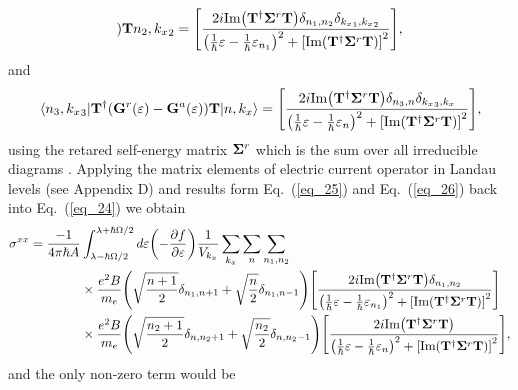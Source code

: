 \begin{widetext}
\begin{equation}
{  )\vb{T}}
  {n_2,{k_x}_2} =
  \qty[
  \frac{2i \text{Im}\qty(\vb{T}^{\dagger} \vb{\Sigma}^r \vb{T})
  \delta_{n_1,n_2}\delta_{{k_x}_1,{k_x}_2}}
  {
  \qty(
  \frac{1}{\hbar}\varepsilon -
  \frac{1}{\hbar}\varepsilon_{n_1}
  )^2
  + \qty[\text{Im}\qty(\vb{T}^{\dagger} \vb{\Sigma}^r \vb{T})]^2
  }],
\end{equation}
and
\begin{equation} \label{eq_26}
  \mel{{n_3,{k_x}_3}}{
  \vb{T}^{\dagger}
  \qty(
  \vb{G}^{r} (\varepsilon) - \vb{G}^{a} (\varepsilon)
  )\vb{T}}
  {n,{k_x}} =
  \qty[
  \frac{2i \text{Im}\qty(\vb{T}^{\dagger} \vb{\Sigma}^r \vb{T})
  \delta_{n_3,n}\delta_{{k_x}_3,{k_x}}}
  {
  \qty(
  \frac{1}{\hbar}\varepsilon -
  \frac{1}{\hbar}\varepsilon_{n}
  )^2
  + \qty[\text{Im}\qty(\vb{T}^{\dagger} \vb{\Sigma}^r \vb{T})]^2
  }],
\end{equation}
using the retared self-energy matrix $\vb{\Sigma}^r$ which is the sum over all irreducible diagrams \cite{wackerl20,wackerlthesis20}. Applying the matrix elements of electric current operator in Landau levels (see Appendix D) and
results form Eq.~(\ref{eq_25}) and Eq.~(\ref{eq_26}) back into Eq.~(\ref{eq_24}) we obtain
\begin{equation} \label{eq_27}
  \begin{aligned}
    {\sigma}^{xx}  =
    \frac{-1}{4\pi\hbar A} &
    \int_{\lambda-\hbar\Omega/2}^{\lambda+ \hbar\Omega/2} d\varepsilon
    \qty(
    -\frac{\partial f}{\partial \varepsilon})
    \frac{1}{V_{k_x}} \sum_{k_x} \sum_{n}
    \sum_{n_1,n_2}
    \\
    & \times
    \frac{e^2B}{{m_e}}
    \qty(\sqrt{\frac{n+1}{2}} \delta_{n_1,n+1} + \sqrt{\frac{n}{2}}
    \delta_{n_1,n-1})
    \qty[
    \frac{2i \text{Im}\qty(\vb{T}^{\dagger} \vb{\Sigma}^r \vb{T})
    \delta_{n_1,n_2}}
    {
    \qty(
    \frac{1}{\hbar}\varepsilon -
    \frac{1}{\hbar}\varepsilon_{n_1}
    )^2
    + \qty[\text{Im}\qty(\vb{T}^{\dagger} \vb{\Sigma}^r \vb{T})]^2
    }] \\
    & \times
    \frac{e^2B}{{m_e}}
    \qty(\sqrt{\frac{n_2+1}{2}} \delta_{n,n_2+1} + \sqrt{\frac{n_2}{2}}
    \delta_{n,n_2-1})
    \qty[
    \frac{2i \text{Im}\qty(\vb{T}^{\dagger} \vb{\Sigma}^r \vb{T})
    }
    {
    \qty(
    \frac{1}{\hbar}\varepsilon -
    \frac{1}{\hbar}\varepsilon_{n}
    )^2
    + \qty[\text{Im}\qty(\vb{T}^{\dagger} \vb{\Sigma}^r \vb{T})]^2
    }],
  \end{aligned}
\end{equation}
and the only non-zero term would be
\begin{equation} \label{eq_28}

\end{equation}
\end{widetext}
